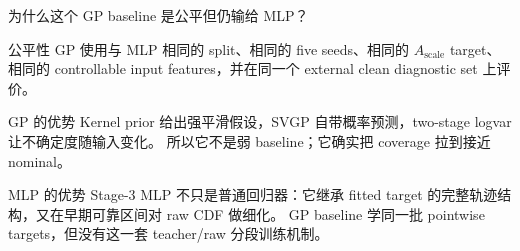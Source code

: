 \documentclass[aspectratio=169,11pt]{beamer}
\begin{document}
\begin{frame}{为什么这个 GP baseline 是公平但仍输给 MLP？}
\small
\begin{block}{公平性}
\footnotesize
GP 使用与 MLP 相同的 split、相同的 five seeds、相同的 \(A_{\mathrm{scale}}\) target、
相同的 controllable input features，并在同一个 external clean diagnostic set 上评价。
\end{block}

\begin{block}{GP 的优势}
\footnotesize
Kernel prior 给出强平滑假设，SVGP 自带概率预测，two-stage logvar 让不确定度随输入变化。
所以它不是弱 baseline；它确实把 coverage 拉到接近 nominal。
\end{block}

\begin{block}{MLP 的优势}
\footnotesize
Stage-3 MLP 不只是普通回归器：它继承 fitted target 的完整轨迹结构，又在早期可靠区间对 raw CDF 做细化。
GP baseline 学同一批 pointwise targets，但没有这一套 teacher/raw 分段训练机制。
\end{block}
\end{frame}
\end{document}
